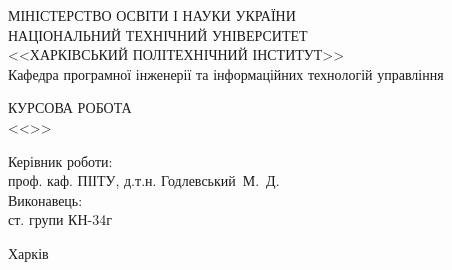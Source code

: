 \begin{titlepage}
	\vspace*{\fill} %
	
	\begin{framed}
		\begin{center}
			МІНІСТЕРСТВО ОСВІТИ І НАУКИ УКРАЇНИ \\
			НАЦІОНАЛЬНИЙ ТЕХНІЧНИЙ УНІВЕРСИТЕТ \\
			<<ХАРКІВСЬКИЙ ПОЛІТЕХНІЧНИЙ ІНСТИТУТ>> \\
			Кафедра програмної інженерії та інформаційних технологій управління
		\end{center}
	
		\begin{center}
			\MakeUppercase{Курсова робота} \\ 
			<<\thetitle>>
		\end{center}
	
		\noindent	
		Керівник роботи: \\
		\hspace*{\parindent} проф. каф. ПІІТУ, д.т.н. \hfill Годлевський~М.~Д. \\
		Виконавець: \\
		\hspace*{\parindent} ст. групи КН-34г \hfill \theauthor
	
		\begin{center}
			Харків \the\year
		\end{center}
	\end{framed}

	\vspace*{\fill} %
\end{titlepage}

